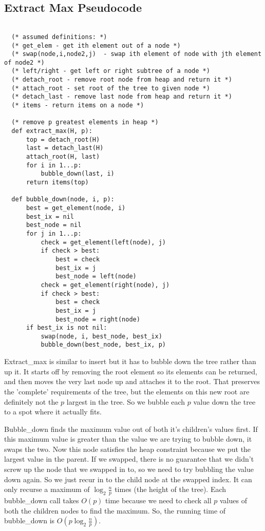 \documentclass[a4paper,12pt]{article}
\begin{document}
\pagebreak

\subsection*{Extract Max Pseudocode}

\begin{verbatim}

  (* assumed definitions: *)
  (* get_elem - get ith element out of a node *)
  (* swap(node,i,node2,j)  - swap ith element of node with jth element of node2 *)
  (* left/right - get left or right subtree of a node *)
  (* detach_root - remove root node from heap and return it *)
  (* attach_root - set root of the tree to given node *)
  (* detach_last - remove last node from heap and return it *)
  (* items - return items on a node *)

  (* remove p greatest elements in heap *)
  def extract_max(H, p):
      top = detach_root(H)
      last = detach_last(H)
      attach_root(H, last)
      for i in 1...p:
          bubble_down(last, i)
      return items(top)

  def bubble_down(node, i, p):
      best = get_element(node, i)
      best_ix = nil
      best_node = nil
      for j in 1...p:
          check = get_element(left(node), j)
          if check > best:
              best = check
              best_ix = j
              best_node = left(node)
          check = get_element(right(node), j)
          if check > best:
              best = check
              best_ix = j
              best_node = right(node)
      if best_ix is not nil:
          swap(node, i, best_node, best_ix)
          bubble_down(best_node, best_ix, p)

\end{verbatim}

Extract\_max is similar to insert but it has to bubble down the tree
rather than up it. It starts off by removing the root element so its
elements can be returned, and then moves the very last node up and
attaches it to the root. That preserves the 'complete' requirements of
the tree, but the elements on this new root are definitely not the $p$
largest in the tree. So we bubble each $p$ value down the tree to a
spot where it actually fits.


Bubble\_down finds the maximum value out of both it's children's
values first. If this maximum value is greater than the value we are
trying to bubble down, it swaps the two. Now this node satisfies the
heap constraint because we put the largest value in the parent. If we
swapped, there is no guarantee that we didn't screw up the node that
we swapped in to, so we need to try bubbling the value down again. So
we just recur in to the child node at the swapped index. It can only
recurse a maximum of $\log_2 \frac{n}{p}$ times (the height of the
tree). Each bubble\_down call takes $O(p)$ time because we need to
check all $p$ values of both the children nodes to find the
maximum. So, the running time of bubble\_down is $O(p\log_2
\frac{n}{p})$.
\end{document}

